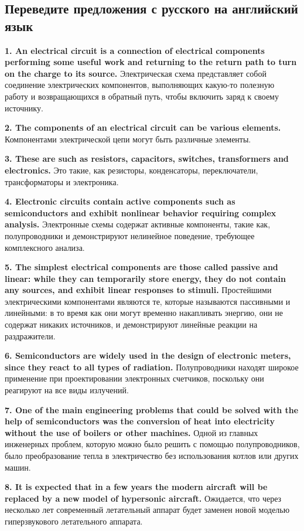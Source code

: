 \subsection{Переведите предложения с русского на английский язык}

\textbf{1. An electrical circuit is a connection of electrical components performing some useful work and returning to the return path to turn on the charge to its source.}
Электрическая схема представляет собой соединение электрических компонентов, выполняющих какую-то полезную работу и возвращающихся в обратный путь, чтобы включить заряд к своему источнику.

\textbf{2. The components of an electrical circuit can be various elements.}
Компонентами электрической цепи могут быть различные элементы.

\textbf{3. These are such as resistors, capacitors, switches, transformers and electronics.}
Это такие, как резисторы, конденсаторы, переключатели, трансформаторы и электроника.

\textbf{4. Electronic circuits contain active components such as semiconductors and exhibit nonlinear behavior requiring complex analysis.}
Электронные схемы содержат активные компоненты, такие как, полупроводники и демонстрируют нелинейное поведение, требующее комплексного анализа.

\textbf{5. The simplest electrical components are those called passive and linear: while they can temporarily store energy, they do not contain any sources, and exhibit linear responses to stimuli.}
Простейшими электрическими компонентами являются те, которые называются пассивными и линейными: в то время как они могут временно накапливать энергию, они не содержат никаких источников, и демонстрируют линейные реакции на раздражители.

\textbf{6. Semiconductors are widely used in the design of electronic meters, since they react to all types of radiation.}
Полупроводники находят широкое применение при проектировании электронных счетчиков, поскольку они реагируют на все виды излучений.

\textbf{7. One of the main engineering problems that could be solved with the help of semiconductors was the conversion of heat into electricity without the use of boilers or other machines.}
Одной из главных инженерных проблем, которую можно было решить с помощью полупроводников, было преобразование тепла в электричество без использования котлов или других машин.

\textbf{8. It is expected that in a few years the modern aircraft will be replaced by a new model of hypersonic aircraft.}
Ожидается, что через несколько лет современный летательный аппарат будет заменен новой моделью гиперзвукового летательного аппарата.

